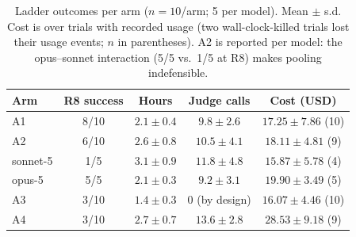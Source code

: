 \begin{table}[t]
\centering
\caption{Ladder outcomes per arm ($n{=}10$/arm; 5 per model). Mean $\pm$ s.d.
Cost is over trials with recorded usage (two wall-clock-killed trials lost
their usage events; $n$ in parentheses). A2 is reported per model: the
opus--sonnet interaction (5/5 vs.\ 1/5 at R8) makes pooling indefensible.}
\label{tab:agents}
\begin{tabular}{lcccc}
\toprule
Arm & R8 success & Hours & Judge calls & Cost (USD) \\
\midrule
A1 & 8/10 & $2.1 \pm 0.4$ & $9.8 \pm 2.6$ & $17.25 \pm 7.86$ (10) \\
A2 & 6/10 & $2.6 \pm 0.8$ & $10.5 \pm 4.1$ & $18.11 \pm 4.81$ (9) \\
\quad sonnet-5 & 1/5 & $3.1 \pm 0.9$ & $11.8 \pm 4.8$ & $15.87 \pm 5.78$ (4) \\
\quad opus-5 & 5/5 & $2.1 \pm 0.3$ & $9.2 \pm 3.1$ & $19.90 \pm 3.49$ (5) \\
A3 & 3/10 & $1.4 \pm 0.3$ & 0 (by design) & $16.07 \pm 4.46$ (10) \\
A4 & 3/10 & $2.7 \pm 0.7$ & $13.6 \pm 2.8$ & $28.53 \pm 9.18$ (9) \\
\bottomrule
\end{tabular}
\end{table}
